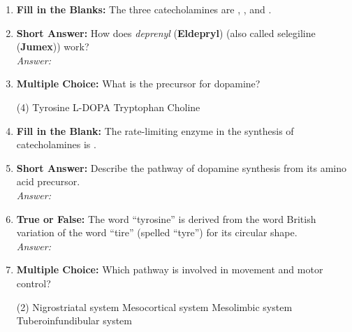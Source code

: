 \begin{enumerate}[label=\textbf{Q3.5.\arabic*}]
    \item \textbf{Fill in the Blanks:} The three catecholamines are \underline{\hspace{3cm}}, \underline{\hspace{3cm}}, and \underline{\hspace{3cm}}.

    \item \textbf{Short Answer:} How does \textit{deprenyl} (\textbf{Eldepryl}) (also called selegiline (\textbf{Jumex})) work? \\
        \textit{Answer:} \\%

    \item \textbf{Multiple Choice:} What is the precursor for dopamine?
        \begin{tasks}[label=\textcolor{\documentTheme}{(\Alph*)}, item-format=\color{\documentTheme}, label-width=1.5em, item-indent=1.7em](4)
            \task Tyrosine
            \task L-DOPA
            \task Tryptophan
            \task Choline
        \end{tasks}

    \item \textbf{Fill in the Blank:} The rate-limiting enzyme in the synthesis of catecholamines is \underline{\hspace{3cm}}.

    \item \textbf{Short Answer:} Describe the pathway of dopamine synthesis from its amino acid precursor. \\
        \textit{Answer:} \\%

    \item \textbf{True or False:} The word ``tyrosine'' is derived from the word British variation of the word ``tire'' (spelled ``tyre'') for its circular shape. \\
        \textit{Answer:} %

    \item \textbf{Multiple Choice:} Which pathway is involved in movement and motor control?
        \begin{tasks}[label=\textcolor{\documentTheme}{(\Alph*)}, item-format=\color{\documentTheme}, label-width=1.5em, item-indent=1.7em](2)
            \task Nigrostriatal system
            \task Mesocortical system
            \task Mesolimbic system
            \task Tuberoinfundibular system
        \end{tasks}


\end{enumerate}
